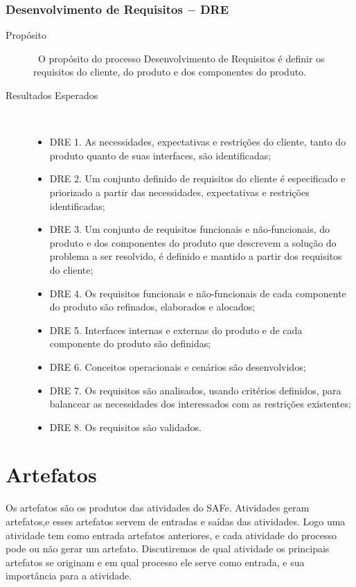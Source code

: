 \subsubsection{Desenvolvimento de Requisitos $-$ DRE}

  \begin{description}
    \item [Propósito] \
     O propósito do processo Desenvolvimento de Requisitos é definir os requisitos
     do cliente, do produto e dos componentes do produto.
    \item [Resultados Esperados]\
      \begin{itemize}
        \item DRE 1. As necessidades, expectativas e restrições do cliente, tanto do produto
              quanto de suas interfaces, são identificadas;
        \item DRE 2. Um conjunto definido de requisitos do cliente é especificado e priorizado
              a partir das necessidades, expectativas e restrições identificadas;
        \item DRE 3. Um conjunto de requisitos funcionais e não-funcionais, do produto e dos componentes
                    do produto que descrevem a solução do problema a ser resolvido, é definido e mantido
                    a partir dos requisitos do cliente;
        \item DRE 4. Os requisitos funcionais e não-funcionais de cada componente do produto são
              refinados, elaborados e alocados;
        \item DRE 5. Interfaces internas e externas do produto e de cada componente do produto são
              definidas;
        \item DRE 6. Conceitos operacionais e cenários são desenvolvidos;
        \item DRE 7. Os requisitos são analisados, usando critérios definidos, para balancear
              as necessidades dos interessados com as restrições existentes;
        \item DRE 8. Os requisitos são validados.
      \end{itemize}
  \end{description}

\section{Artefatos}
  
  Os artefatos são os produtos das atividades do SAFe. Atividades geram artefatos,e esses artefatos servem de entradas e saídas das atividades. Logo uma atividade tem como entrada artefatos anteriores, e cada atividade do processo pode ou não gerar um artefato.
  Discutiremos de qual atividade os principais artefatos se originam e em qual processo ele serve como entrada, e sua importância para a atividade.


